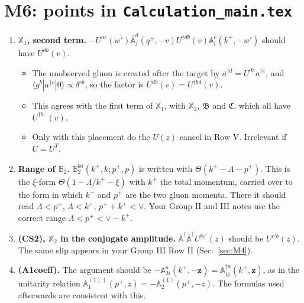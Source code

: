 \documentclass[10pt]{article}
\numberwithin{equation}{section}
\def\mf#1{\mathbb{#1}}
\begin{document}
\section{M6: points in \texttt{Calculation\_main.tex}}\label{sec:main}
\begin{enumerate}
\item \textbf{$\mathbb X_1$, second term.} $-U^{ac}(w')\bar{\mf A}^d_j(q^+,-v)U^{\dagger db}(v)\mf A^c_i(k^+,-w')$ should have $U^{db}(v)$.
\begin{itemize}
\item The unobserved gluon is created after the target by $\bar a^{\dagger d}=U^{de}a^{\dagger e}$, and $\langle g^b|a^{\dagger e}|0\rangle\propto\delta^{eb}$, so the factor is $U^{db}(v)=U^{\dagger bd}(v)$.
\item This agrees with the first term of $\mathbb X_1$, with $\mathbb X_2$, $\mathfrak B$ and $\mathfrak C$, which all have $U^{\dagger b\cdot}(v)$.
\item Only with this placement do the $U(z)$ cancel in Row V. Irrelevant if $U=U^T$.
\end{itemize}
\item \textbf{Range of $\mf B_2$.} $\mf B^{ba}_2(k^+,k;p^+,p)$ is written with $\Theta(k^+-\Lambda-p^+)$. This is the $\xi$-form $\Theta(1-\Lambda/k^+-\xi)$ with $k^+$ the total momentum, carried over to the form in which $k^+$ and $p^+$ are the two gluon momenta. There it should read $\Lambda<p^+$, $\Lambda<k^+$, $p^++k^+<\vee$. Your Group II and III notes use the correct range $\Lambda<p^+<\vee-k^+$.
\item \textbf{(CS2), $\mathbb X_2$ in the conjugate amplitude.} $\bar{\mf A}^\dagger\bar{\mf A}^\dagger U^{bc'}(z)$ should be $U^{c'b}(z)$. The same slip appears in your Group III Row II (Sec.~\ref{sec:M4}).
\item \textbf{(A1coeff).} The argument should be $-\mf A^a_{2i}(k^+,-\mathbf z)=\mf A^{\dagger a}_{1i}(k^+,\mathbf z)$, as in the unitarity relation $\mf A^{(1)\dagger}_1(p^+,z)=-\mf A^{(1)}_2(p^+,-z)$. The formulas used afterwards are consistent with this.
\end{enumerate}

\end{document}
